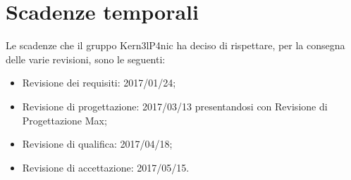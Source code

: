 \documentclass[../PianoDiQualifica.tex]{subfiles}
\begin{document}
\section{Scadenze temporali}
	Le scadenze che il gruppo Kern3lP4nic ha deciso di rispettare, per la consegna delle varie revisioni, sono le seguenti:
	\begin{itemize}
		\item Revisione dei requisiti: 2017/01/24;
		\item Revisione di progettazione: 2017/03/13 presentandosi con Revisione di Progettazione Max;
		\item Revisione di qualifica: 2017/04/18;
		\item Revisione di accettazione: 2017/05/15.
	\end{itemize}
	
\end{document}

